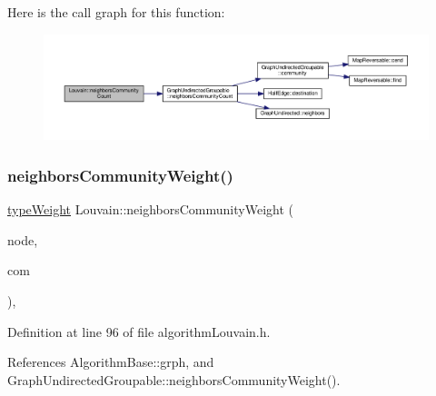 Here is the call graph for this function\+:
\nopagebreak
\begin{figure}[H]
\begin{center}
\leavevmode
\includegraphics[width=350pt]{classLouvain_a10483312016ad92ce019a80afdc8d6cf_cgraph}
\end{center}
\end{figure}
\mbox{\label{classLouvain_a6e53ceb9865522beede2212de660f42c}} 
\subsubsection{\texorpdfstring{neighbors\+Community\+Weight()}{neighborsCommunityWeight()}\hspace{0.1cm}{\footnotesize\ttfamily [1/2]}}
{\footnotesize\ttfamily \hyperlink{edge_8h_a2e7ea3be891ac8b52f749ec73fee6dd2}{type\+Weight} Louvain\+::neighbors\+Community\+Weight (\begin{DoxyParamCaption}\item[{const \hyperlink{edge_8h_a5fbd20c46956d479cb10afc9855223f6}{type\+Vertex} \&}]{node,  }\item[{const \hyperlink{graphUndirectedGroupable_8h_a914da95c9ea7f14f4b7f875c36818556}{type\+Community} \&}]{com }\end{DoxyParamCaption})\hspace{0.3cm}{\ttfamily [inline]}, {\ttfamily [private]}}



Definition at line 96 of file algorithm\+Louvain.\+h.



References Algorithm\+Base\+::grph, and Graph\+Undirected\+Groupable\+::neighbors\+Community\+Weight().

